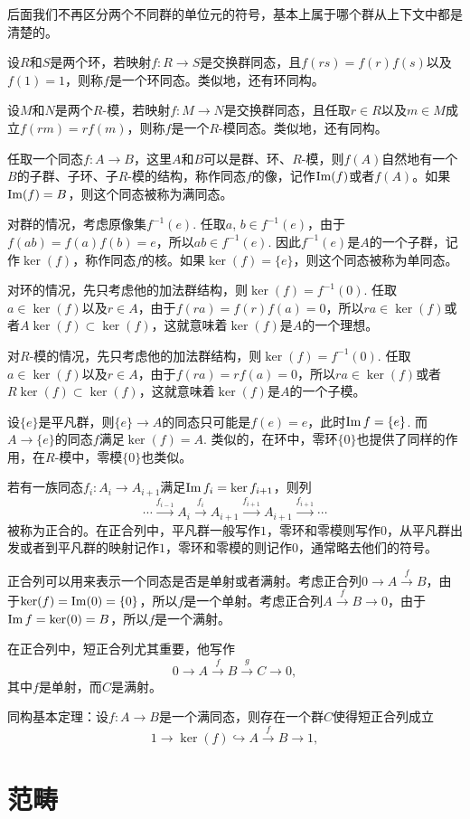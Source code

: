 后面我们不再区分两个不同群的单位元的符号，基本上属于哪个群从上下文中都是清楚的。

\para 设$R$和$S$是两个环，若映射$f:R\to S$是交换群同态，且$f(rs)=f(r)f(s)$以及$f(1)=1$，则称$f$是一个环同态。类似地，还有环同构。

设$M$和$N$是两个$R$-模，若映射$f:M\to N$是交换群同态，且任取$r\in R$以及$m\in M$成立$f(rm)=rf(m)$，则称$f$是一个$R$-模同态。类似地，还有同构。

\para 任取一个同态$f:A\to B$，这里$A$和$B$可以是群、环、$R$-模，则$f(A)$自然地有一个$B$的子群、子环、子$R$-模的结构，称作同态$f$的像，记作$\operatorname{Im}(f)$或者$f(A)$。如果$\operatorname{Im}(f)=B$，则这个同态被称为满同态。

对群的情况，考虑原像集$f^{-1}(e)$. 任取$a$, $b\in f^{-1}(e)$，由于$f(ab)=f(a)f(b)=e$，所以$ab\in f^{-1}(e)$. 因此$f^{-1}(e)$是$A$的一个子群，记作$\ker(f)$，称作同态$f$的核。如果$\ker(f)=\{e\}$，则这个同态被称为单同态。

对环的情况，先只考虑他的加法群结构，则$\ker(f)=f^{-1}(0)$. 任取$a\in \ker(f)$以及$r\in A$，由于$f(ra)=f(r)f(a)=0$，所以$ra\in \ker(f)$或者$A\ker(f)\subset \ker(f)$，这就意味着$\ker(f)$是$A$的一个理想。

对$R$-模的情况，先只考虑他的加法群结构，则$\ker(f)=f^{-1}(0)$. 任取$a\in \ker(f)$以及$r\in A$，由于$f(ra)=rf(a)=0$，所以$ra\in \ker(f)$或者$R\ker(f)\subset \ker(f)$，这就意味着$\ker(f)$是$A$的一个子模。

\para 设$\{e\}$是平凡群，则$\{e\}\to A$的同态只可能是$f(e)=e$，此时$\operatorname{Im} f =\{e\}$. 而$A\to \{e\}$的同态$f$满足$\ker(f)=A$. 类似的，在环中，零环$\{0\}$也提供了同样的作用，在$R$-模中，零模$\{0\}$也类似。

\para 若有一族同态$f_i:A_i\to A_{i+1}$满足$\operatorname{Im} f_i=\ker f_{i+1}$，则列
\[
	\cdots \xrightarrow{f_{i-1}}A_i \xrightarrow{f_i} A_{i+1} \xrightarrow{f_{i+1}} A_{i+1}\xrightarrow{f_{i+1}}\cdots
\]
被称为正合的。在正合列中，平凡群一般写作$1$，零环和零模则写作$0$，从平凡群出发或者到平凡群的映射记作$1$，零环和零模的则记作$0$，通常略去他们的符号。

正合列可以用来表示一个同态是否是单射或者满射。考虑正合列$0\to A\xrightarrow{f} B$，由于$\ker(f)=\operatorname{Im}(0)=\{0\}$，所以$f$是一个单射。考虑正合列$A\xrightarrow{f} B\to 0$，由于$\operatorname{Im} f=\ker(0)=B$，所以$f$是一个满射。

在正合列中，短正合列尤其重要，他写作
\[
	0\to A \xrightarrow{f} B \xrightarrow{g} C\to 0,
\]
其中$f$是单射，而$C$是满射。

\theo 同构基本定理：设$f:A\to B$是一个满同态，则存在一个群$C$使得短正合列成立
\[
	1\to \ker(f) \hookrightarrow A \xrightarrow{f} B\to 1,
\]
\section{范畴}